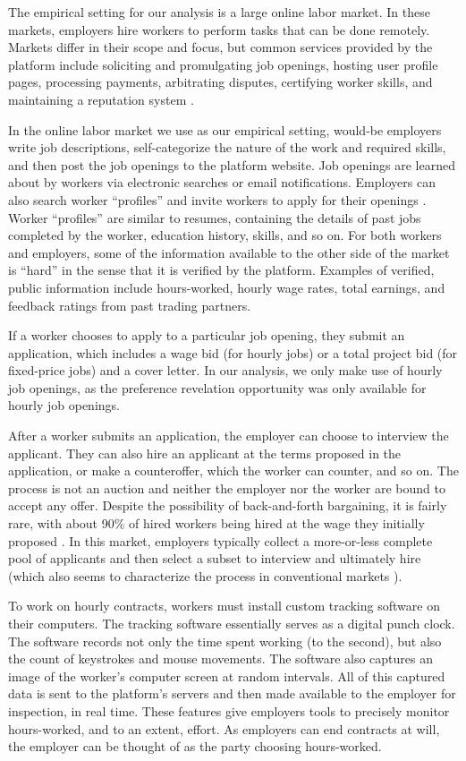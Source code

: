 \documentclass[12pt]{article}
\begin{document}
The empirical setting for our analysis is a large online labor market.
In these markets, employers hire workers to perform tasks that can be done remotely.
Markets differ in their scope and focus, but common services provided by the platform include soliciting and promulgating job openings, hosting user profile pages, processing payments, arbitrating disputes, certifying worker skills, and maintaining a reputation system \citep{Horton2010, horton2015reputation}.

In the online labor market we use as our empirical setting, would-be employers write job descriptions, self-categorize the nature of the work and required skills, and then post the job openings to the platform website.
Job openings are learned about by workers via electronic searches or email notifications.
Employers can also search worker ``profiles'' and invite workers to apply for their openings \citep{horton2017effects}.
Worker ``profiles''  are similar to resumes, containing the details of past jobs completed by the worker, education history, skills, and so on.
For both workers and employers, some of the information available to the other side of the market is ``hard'' in the sense that it is verified by the platform.
Examples of verified, public information include hours-worked, hourly wage rates, total earnings, and feedback ratings from past trading partners.

If a worker chooses to apply to a particular job opening, they submit an application, which includes a wage bid (for hourly jobs) or a total project bid (for fixed-price jobs) and a cover letter.
In our analysis, we only make use of hourly job openings, as the preference revelation opportunity was only available for hourly job openings. 

After a worker submits an application, the employer can choose to interview the applicant.
They can also hire an applicant at the terms proposed in the application, or make a counteroffer, which the worker can counter, and so on.
The process is not an auction and neither the employer nor the worker are bound to accept any offer. 
Despite the possibility of back-and-forth bargaining, it is fairly rare, with about 90\% of hired workers being hired at the wage they initially proposed \citep{barach2016info}.
In this market, employers typically collect a more-or-less complete pool of applicants and then select a subset to interview and ultimately hire (which also seems to characterize the process in conventional markets \citep{davis2021}).

To work on hourly contracts, workers must install custom tracking software on their computers. 
The tracking software essentially serves as a digital punch clock.
The software records not only the time spent working (to the second), but also the count of keystrokes and mouse movements.
The software also captures an image of the worker's computer screen at random intervals.
All of this captured data is sent to the platform's servers and then made available to the employer for inspection, in real time.
These features give employers tools to precisely monitor hours-worked, and to an extent, effort.
As employers can end contracts at will, the employer can be thought of as the party choosing hours-worked.
\end{document}
